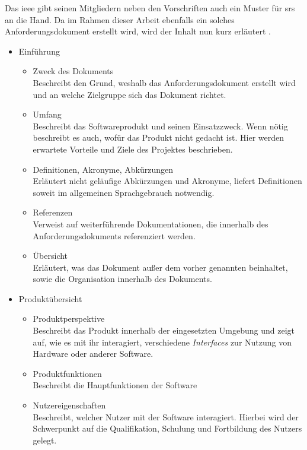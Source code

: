 Das \ac{ieee} gibt seinen Mitgliedern neben den Vorschriften auch ein Muster für \ac{srs} an die Hand. Da im Rahmen dieser Arbeit ebenfalls ein solches Anforderungsdokument erstellt wird, wird der Inhalt nun kurz erläutert \citep[vgl.][S. 11 ff.]{ieee1998}.
\begin{itemize}
	\item Einführung \citep[vgl.][S. 11 - 12]{ieee1998}
	\begin{itemize}
		\item Zweck des Dokuments \\
		Beschreibt den Grund, weshalb das Anforderungsdokument erstellt wird und an welche Zielgruppe sich das Dokument richtet.
		\item Umfang \\
		Beschreibt das Softwareprodukt und seinen Einsatzzweck. Wenn nötig beschreibt es auch, wofür das Produkt nicht gedacht ist. Hier werden erwartete Vorteile und Ziele des Projektes beschrieben.
		\item Definitionen, Akronyme, Abkürzungen \\
		Erläutert nicht geläufige Abkürzungen und Akronyme, liefert Definitionen soweit im allgemeinen Sprachgebrauch notwendig.
		\item Referenzen \\
		Verweist auf weiterführende Dokumentationen, die innerhalb des Anforderungsdokuments referenziert werden.
		\item Übersicht \\
		Erläutert, was das Dokument außer dem vorher genannten beinhaltet, sowie die Organisation innerhalb des Dokuments.
	\end{itemize}
	\item Produktübersicht \citep[vgl.][S. 12 - 15]{ieee1998}
	\begin{itemize}
		\item Produktperspektive \\
		Beschreibt das Produkt innerhalb der eingesetzten Umgebung und zeigt auf, wie es mit ihr interagiert, \zb verschiedene \textit{Interfaces} zur Nutzung von Hardware oder anderer Software.
		\item Produktfunktionen \\
		Beschreibt die Hauptfunktionen der Software
		\item Nutzereigenschaften \\
		Beschreibt, welcher Nutzer mit der Software interagiert. Hierbei wird der Schwerpunkt auf die Qualifikation, Schulung und Fortbildung des Nutzers gelegt.

\end{itemize}
\end{itemize}
